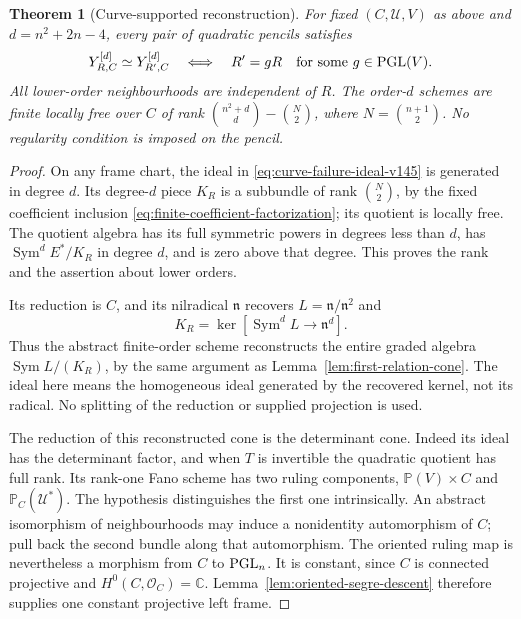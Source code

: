 \documentclass[11pt,reqno]{amsart}
\numberwithin{equation}{section}
\newtheorem{theorem}{Theorem}[section]
\theoremstyle{definition}\newtheorem{definition}[theorem]{Definition}
\theoremstyle{remark}\newtheorem{remark}[theorem]{Remark}
\newcommand{\C}{\mathbb C}\newcommand{\Q}{\mathbb Q}
\newcommand{\Pj}{\mathbb P}\newcommand{\A}{\mathbb A}
\newcommand{\OO}{\mathcal O}\newcommand{\II}{\mathcal I}
\DeclareMathOperator{\Sym}{Sym}\DeclareMathOperator{\Gr}{Gr}
\begin{document}
\begin{theorem}[Curve-supported reconstruction]
\label{thm:curve-reconstruction-v145}
For fixed \((C,\mathcal U,V)\) as above and
\(d=n^2+2n-4\), every pair of quadratic pencils satisfies
\begin{equation}\label{eq:curve-torelli-v145}
 Y_{R,C}^{[d]}\simeq Y_{R',C}^{[d]}
       \quad\Longleftrightarrow\quad R'=gR
              \quad\text{for some }g\in\operatorname{PGL}(V).
\end{equation}
All lower-order neighbourhoods are independent of \(R\).
The order-\(d\) schemes are finite locally free over \(C\) of rank
\(\binom{n^2+d}{d}-\binom{N}{2}\), where \(N=\binom{n+1}{2}\).
No regularity condition is imposed on the pencil.
\end{theorem}
\begin{proof}
On any frame chart, the ideal in
\eqref{eq:curve-failure-ideal-v145} is generated in degree \(d\).
Its degree-\(d\) piece \(K_R\) is a subbundle of rank
\(\binom N2\), by the fixed coefficient inclusion
\eqref{eq:finite-coefficient-factorization}; its quotient is locally
free.  The quotient algebra has its full symmetric powers in degrees
less than \(d\), has \(\Sym^dE^*/K_R\) in degree \(d\),
and is zero above that degree.  This proves the rank and the assertion
about lower orders.

Its reduction is \(C\), and its nilradical \(\mathfrak n\)
recovers \(L=\mathfrak n/\mathfrak n^2\) and
\[
       K_R=\ker[\Sym^dL\longrightarrow\mathfrak n^d].
\]
Thus the abstract finite-order scheme reconstructs the entire graded
algebra \(\Sym L/(K_R)\), by the same argument as
Lemma~\ref{lem:first-relation-cone}.  The ideal here means the
homogeneous ideal generated by the recovered kernel, not its radical.
No splitting of the reduction or supplied projection is used.

The reduction of this reconstructed cone is the determinant cone.
Indeed its ideal has the determinant factor, and when \(T\) is
invertible the quadratic quotient has full rank.  Its rank-one Fano
scheme has two ruling components,
\(\Pj(V)\times C\) and \(\Pj_C(\mathcal U^*)\).
The hypothesis distinguishes the first one intrinsically.  An abstract
isomorphism of neighbourhoods may induce a nonidentity automorphism
of \(C\); pull back the second bundle along that automorphism.
The oriented ruling map is nevertheless a morphism from \(C\) to
\(\operatorname{PGL}_n\).  It is constant, since \(C\) is connected projective
and \(H^0(C,\OO_C)=\C\).  Lemma~\ref{lem:oriented-segre-descent}
therefore supplies one constant projective left frame.


\end{proof}
\end{document}
